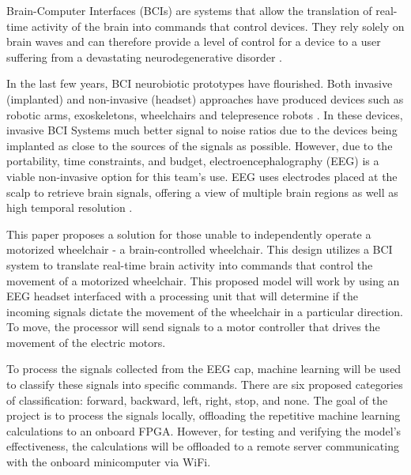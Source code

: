 \documentclass[conference]{IEEEtran}
\begin{document}
    Brain-Computer Interfaces (BCIs) are systems that allow the translation of real-time activity of the brain into commands that control devices. They rely solely on brain waves and can therefore provide a level of control for a device to a user suffering from a devastating neurodegenerative disorder \cite{noninvasive_brain}.

    In the last few years, BCI neurobiotic prototypes have flourished. Both invasive (implanted) and non-invasive (headset) approaches have produced devices such as robotic arms, exoskeletons, wheelchairs and telepresence robots \cite{learning_to_control}. In these devices, invasive BCI Systems much better signal to noise ratios due to the devices being implanted as close to the sources of the signals as possible. However, due to the portability, time constraints, and budget, electroencephalography (EEG) is a viable non-invasive option for this team's use. EEG uses electrodes placed at the scalp to retrieve brain signals, offering a view of multiple brain regions as well as high temporal resolution \cite{toward_brain_computer}.
    
    This paper proposes a solution for those unable to independently operate a motorized wheelchair - a brain-controlled wheelchair. This design utilizes a BCI system to translate real-time brain activity into commands that control the movement of a motorized wheelchair. This proposed model will work by using an EEG headset interfaced with a processing unit that will determine if the incoming signals dictate the movement of the wheelchair in a particular direction. To move, the processor will send signals to a motor controller that drives the movement of the electric motors. 
    
    To process the signals collected from the EEG cap, machine learning will be used to classify these signals into specific commands. There are six proposed categories of classification: forward, backward, left, right, stop, and none. The goal of the project is to process the signals locally, offloading the repetitive machine learning calculations to an onboard FPGA. However, for testing and verifying the model's effectiveness, the calculations will be offloaded to a remote server communicating with the onboard minicomputer via WiFi. 
\end{document}
